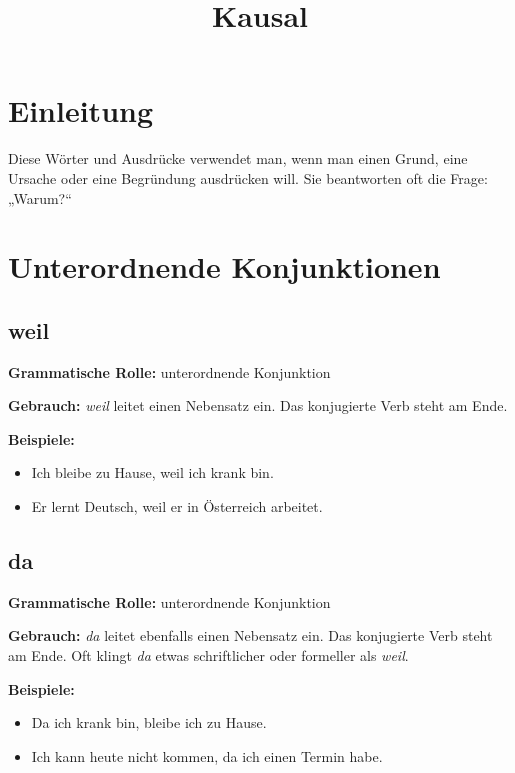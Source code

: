 \documentclass[a4paper]{article}
\title{Kausal}
\date{}
\begin{document}
    \maketitle
    
    
    \section{Einleitung}
        
        Diese Wörter und Ausdrücke verwendet man, wenn man einen Grund, eine Ursache oder eine Begründung ausdrücken will. Sie beantworten oft die Frage: „Warum?“
    
    
    \section{Unterordnende Konjunktionen}
        
        \subsection{weil}
            
            \textbf{Grammatische Rolle:} unterordnende Konjunktion
            
            \textbf{Gebrauch:} \emph{weil} leitet einen Nebensatz ein. Das konjugierte Verb steht am Ende.
            
            \textbf{Beispiele:}
            \begin{itemize}
                \item Ich bleibe zu Hause, weil ich krank bin.
                \item Er lernt Deutsch, weil er in Österreich arbeitet.
            \end{itemize}
        
        \subsection{da}
            
            \textbf{Grammatische Rolle:} unterordnende Konjunktion
            
            \textbf{Gebrauch:} \emph{da} leitet ebenfalls einen Nebensatz ein. Das konjugierte Verb steht am Ende. Oft klingt \emph{da} etwas schriftlicher oder formeller als \emph{weil}.
            
            \textbf{Beispiele:}
            \begin{itemize}
                \item Da ich krank bin, bleibe ich zu Hause.
                \item Ich kann heute nicht kommen, da ich einen Termin habe.
            \end{itemize}
    
\end{document}
